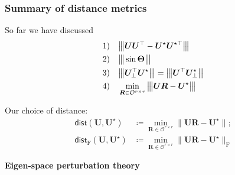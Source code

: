 \documentclass[compress,
mathserif,wide,%
]{beamer}
\begin{document}
\begin{frame}
	\frametitle{Summary of distance metrics}
So far we have discussed
	\begin{align}
	\mathrm{1)} \quad & \vertiiibig{\bm{U}\bm{U}^{\top} - \bm{U}^{\star}\bm{U}^{\star\top}}  \notag\\
	\mathrm{2)} \quad & \vertiiibig{\sin\bm{\Theta}}  \notag\\
	\mathrm{3)} \quad & \vertiiibig{ \bm{U}_{\perp}^{\top}\bm{U}^{\star} }=\vertiiibig{ \bm{U}^{\top}\bm{U}^{\star}_{\perp} }  \notag \\
	\mathrm{4)} \quad & \min_{\bm{R}\in \mathcal{O}^{r\times r}} \vertiiibig{ \bm{U}\bm{R} - \bm{U}^{\star} } \notag
\end{align}

\pause
Our choice of distance: 
\begin{subequations}
\label{eq:dist_UUstar}
\begin{align*}
	\mathsf{dist}(\bm{U},\bm{U}^{\star}) &\coloneqq \min_{\bm{R}\in \mathcal{O}^{r\times r}} \big\| \bm{U}\bm{R} - \bm{U}^{\star} \big\|; \\
	\mathsf{dist}_{\mathrm{F}}(\bm{U},\bm{U}^{\star}) &\coloneqq  \min_{\bm{R}\in \mathcal{O}^{r\times r}} \big\| \bm{U}\bm{R} - \bm{U}^{\star} \big\|_{\mathrm{F}}
\end{align*}
\end{subequations}

\end{frame}



\begin{frame}[plain]

\vfill
\begin{center}
  {\Large\bf Eigen-space perturbation theory}
\end{center}
\vfill

\end{frame}
\end{document}

